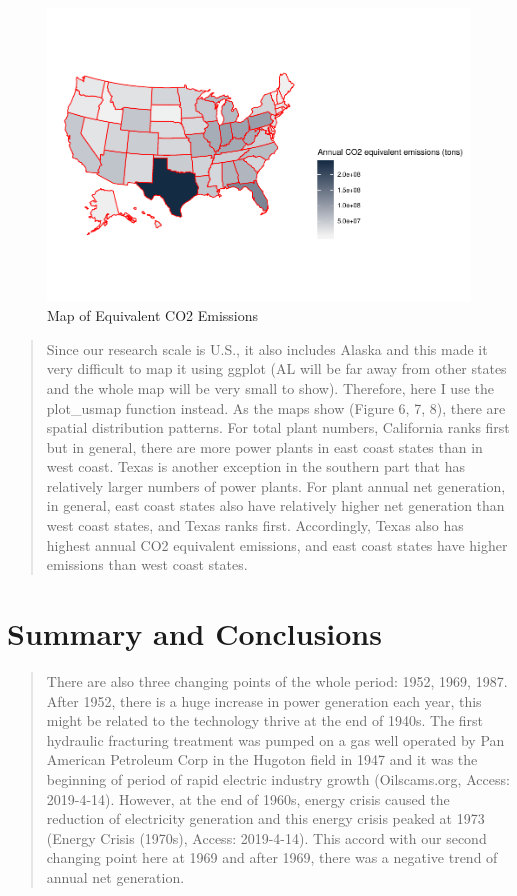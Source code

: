 \documentclass[12pt,]{article}
\begin{document}
\begin{figure}
\centering
\includegraphics{Zhang_X_ENV872_Project_files/figure-latex/unnamed-chunk-12-1.pdf}
\caption{Map of Equivalent CO2 Emissions}
\end{figure}

\begin{quote}
Since our research scale is U.S., it also includes Alaska and this made
it very difficult to map it using ggplot (AL will be far away from other
states and the whole map will be very small to show). Therefore, here I
use the plot\_usmap function instead. As the maps show (Figure 6, 7, 8),
there are spatial distribution patterns. For total plant numbers,
California ranks first but in general, there are more power plants in
east coast states than in west coast. Texas is another exception in the
southern part that has relatively larger numbers of power plants. For
plant annual net generation, in general, east coast states also have
relatively higher net generation than west coast states, and Texas ranks
first. Accordingly, Texas also has highest annual CO2 equivalent
emissions, and east coast states have higher emissions than west coast
states.
\end{quote}

\newpage

\section{Summary and Conclusions}\label{summary-and-conclusions}

\begin{quote}
There are also three changing points of the whole period: 1952, 1969,
1987. After 1952, there is a huge increase in power generation each
year, this might be related to the technology thrive at the end of
1940s. The first hydraulic fracturing treatment was pumped on a gas well
operated by Pan American Petroleum Corp in the Hugoton field in 1947 and
it was the beginning of period of rapid electric industry growth
(Oilscams.org, Access: 2019-4-14). However, at the end of 1960s, energy
crisis caused the reduction of electricity generation and this energy
crisis peaked at 1973 (Energy Crisis (1970s), Access: 2019-4-14). This
accord with our second changing point here at 1969 and after 1969, there
was a negative trend of annual net generation.
\end{quote}
\end{document}
